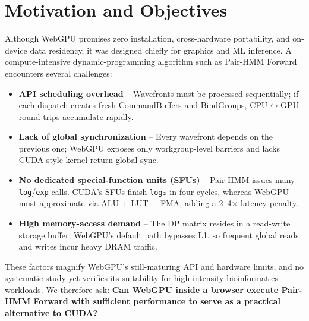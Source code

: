 \documentclass[PhD]{PHlab-thesis}
\begin{document}
\section{Motivation and Objectives}
Although WebGPU promises zero installation, cross-hardware portability, and on-device data residency, it was designed chiefly for graphics and ML inference. A compute-intensive dynamic-programming algorithm such as Pair-HMM Forward encounters several challenges:
\begin{itemize}
    \item \textbf{API scheduling overhead} – Wavefronts must be processed sequentially; if each dispatch creates fresh CommandBuffers and BindGroups, CPU$\leftrightarrow$GPU round-trips accumulate rapidly.
    \item \textbf{Lack of global synchronization} – Every wavefront depends on the previous one; WebGPU exposes only workgroup-level barriers and lacks CUDA-style kernel-return global sync.
    \item \textbf{No dedicated special-function units (SFUs)} – Pair-HMM issues many \texttt{log}/\texttt{exp} calls. CUDA’s SFUs finish \texttt{log₂} in four cycles, whereas WebGPU must approximate via ALU + LUT + FMA, adding a 2–4$\times$ latency penalty.
    \item \textbf{High memory-access demand} – The DP matrix resides in a read-write storage buffer; WebGPU’s default path bypasses L1, so frequent global reads and writes incur heavy DRAM traffic.
\end{itemize}
These factors magnify WebGPU’s still-maturing API and hardware limits, and no systematic study yet verifies its suitability for high-intensity bioinformatics workloads. We therefore ask: \textbf{Can WebGPU inside a browser execute Pair-HMM Forward with sufficient performance to serve as a practical alternative to CUDA?}
\end{document}
